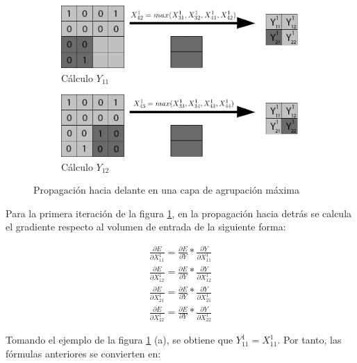 \begin{figure}[H]
	\begin{subfigure}{.5\textwidth}
		\hspace{-10mm}
		\includegraphics[width=1.2\linewidth]{imagenes/back_maxpool_3.jpg}  
		\caption{Cálculo $Y_{11}$}
	\end{subfigure}%
	\begin{subfigure}{.5\textwidth}
		\hspace{10mm}
		\includegraphics[width=1.2\linewidth]{imagenes/back_maxpool_4.jpg}  
		\caption{Cálculo $Y_{12}$}
	\end{subfigure}%
	\caption{Propagación hacia delante en una capa de agrupación máxima}
	\label{fig:back_prop_maxpool}
\end{figure}

Para la primera iteración de la figura \ref{fig:back_prop_maxpool}, en la propagación hacia detrás se calcula el gradiente respecto al volumen de entrada de la siguiente forma:

\begin{gather}
	\frac{\partial E}{\partial X^1_{11}} = \frac{\partial E}{\partial Y} * \frac{\partial Y}{\partial X^1_{11}} \\
	\frac{\partial E}{\partial X^1_{12}} = \frac{\partial E}{\partial Y} * \frac{\partial Y}{\partial X^1_{12}} \\
	\frac{\partial E}{\partial X^1_{21}} = \frac{\partial E}{\partial Y} * \frac{\partial Y}{\partial X^1_{21}} \\
	\frac{\partial E}{\partial X^1_{22}} = \frac{\partial E}{\partial Y} * \frac{\partial Y}{\partial X^1_{22}}
\end{gather}

 
Tomando el ejemplo de la figura \ref{fig:back_prop_maxpool} (a), se obtiene que $Y^1_{11} = X^1_{11}$. Por tanto, las fórmulas anteriores se convierten en:


